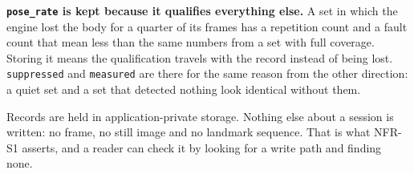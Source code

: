 \textbf{\texttt{pose\_\allowbreak{}rate} is kept because it qualifies everything else.} A set in which the engine lost the body for a quarter of its frames has a repetition count and a fault count that mean less than the same numbers from a set with full coverage. Storing it means the qualification travels with the record instead of being lost. \texttt{suppressed} and \texttt{measured} are there for the same reason from the other direction: a quiet set and a set that detected nothing look identical without them.

Records are held in application-private storage. Nothing else about a session is written: no frame, no still image and no landmark sequence. That is what NFR-S1 asserts, and a reader can check it by looking for a write path and finding none.
